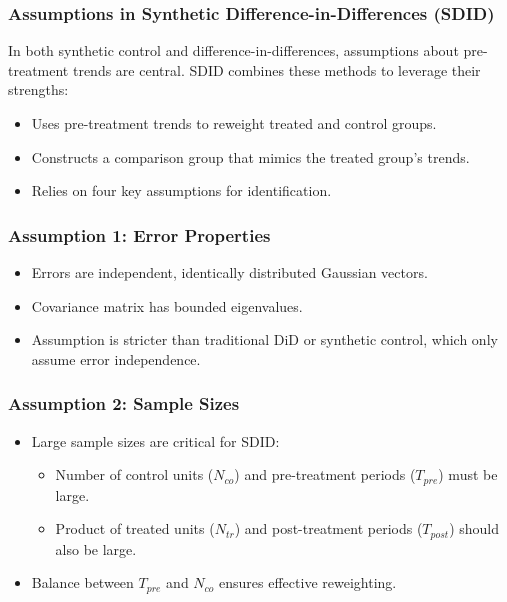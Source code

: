 \documentclass{beamer}
\begin{document}
\begin{frame}
\frametitle{Assumptions in Synthetic Difference-in-Differences (SDID)}

In both synthetic control and difference-in-differences, assumptions about pre-treatment trends are central. SDID combines these methods to leverage their strengths:

\begin{itemize}
    \item Uses pre-treatment trends to reweight treated and control groups.
    \item Constructs a comparison group that mimics the treated group's trends.
    \item Relies on four key assumptions for identification.
\end{itemize}

\end{frame}


\begin{frame}
\frametitle{Assumption 1: Error Properties}

\begin{itemize}
    \item Errors are independent, identically distributed Gaussian vectors.
    \item Covariance matrix has bounded eigenvalues.
    \item Assumption is stricter than traditional DiD or synthetic control, which only assume error independence.
\end{itemize}

\end{frame}


\begin{frame}
\frametitle{Assumption 2: Sample Sizes}

\begin{itemize}
    \item Large sample sizes are critical for SDID:
    \begin{itemize}
        \item Number of control units ($N_{co}$) and pre-treatment periods ($T_{pre}$) must be large.
        \item Product of treated units ($N_{tr}$) and post-treatment periods ($T_{post}$) should also be large.
    \end{itemize}
    \item Balance between $T_{pre}$ and $N_{co}$ ensures effective reweighting.
\end{itemize}

\end{frame}
\end{document}
